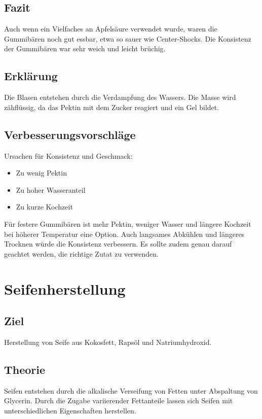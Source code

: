 \documentclass{article}
\begin{document}
    \subsection{Fazit}
    Auch wenn ein Vielfaches an Apfelsäure verwendet wurde, waren die Gummibären noch gut essbar,
    etwa so sauer wie Center-Shocks.
    Die Konsistenz der Gummibären war sehr weich und leicht brüchig.

    \subsection{Erklärung}
    Die Blasen entstehen durch die Verdampfung des Wassers.
    Die Masse wird zähflüssig, da das Pektin mit dem Zucker reagiert und ein Gel bildet.

    \subsection{Verbesserungsvorschläge}
    Ursachen für Konsistenz und Geschmack:

    \begin{itemize}
        \item Zu wenig Pektin
        \item Zu hoher Wasseranteil
        \item Zu kurze Kochzeit
    \end{itemize}
    Für festere Gummibären ist mehr Pektin, weniger Wasser und längere Kochzeit bei höherer Temperatur eine Option.
    Auch langsames Abkühlen und längeres Trocknen würde die Konsistenz verbessern.
    Es sollte zudem genau darauf geachtet werden, die richtige Zutat zu verwenden.

    \section{Seifenherstellung}

    \subsection{Ziel}
    Herstellung von Seife aus Kokosfett, Rapsöl und Natriumhydroxid.

    \subsection{Theorie}
    Seifen entstehen durch die alkalische Verseifung von Fetten unter Abspaltung von Glycerin. Durch die Zugabe variierender Fettanteile lassen sich Seifen mit unterschiedlichen Eigenschaften herstellen.
\end{document}
